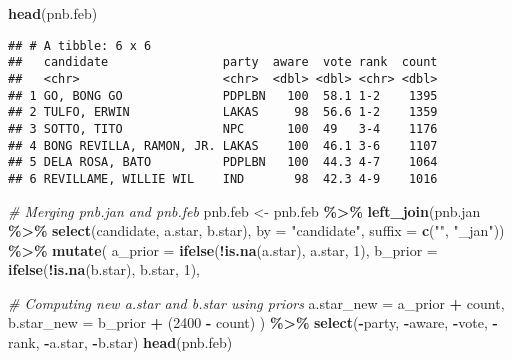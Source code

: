 \documentclass[]{article}
\newenvironment{Shaded}{\begin{snugshade}}{\end{snugshade}}
\newcommand{\AttributeTok}[1]{\textcolor[rgb]{0.13,0.29,0.53}{#1}}
\newcommand{\CommentTok}[1]{\textcolor[rgb]{0.56,0.35,0.01}{\textit{#1}}}
\newcommand{\DecValTok}[1]{\textcolor[rgb]{0.00,0.00,0.81}{#1}}
\newcommand{\FunctionTok}[1]{\textcolor[rgb]{0.13,0.29,0.53}{\textbf{#1}}}
\newcommand{\NormalTok}[1]{#1}
\newcommand{\OtherTok}[1]{\textcolor[rgb]{0.56,0.35,0.01}{#1}}
\newcommand{\SpecialCharTok}[1]{\textcolor[rgb]{0.81,0.36,0.00}{\textbf{#1}}}
\newcommand{\StringTok}[1]{\textcolor[rgb]{0.31,0.60,0.02}{#1}}
\begin{document}
\begin{Shaded}
\begin{Highlighting}[]
\FunctionTok{head}\NormalTok{(pnb.feb)}
\end{Highlighting}
\end{Shaded}

\begin{verbatim}
## # A tibble: 6 x 6
##   candidate                party  aware  vote rank  count
##   <chr>                    <chr>  <dbl> <dbl> <chr> <dbl>
## 1 GO, BONG GO              PDPLBN   100  58.1 1-2    1395
## 2 TULFO, ERWIN             LAKAS     98  56.6 1-2    1359
## 3 SOTTO, TITO              NPC      100  49   3-4    1176
## 4 BONG REVILLA, RAMON, JR. LAKAS    100  46.1 3-6    1107
## 5 DELA ROSA, BATO          PDPLBN   100  44.3 4-7    1064
## 6 REVILLAME, WILLIE WIL    IND       98  42.3 4-9    1016
\end{verbatim}

\begin{Shaded}
\begin{Highlighting}[]
\CommentTok{\# Merging pnb.jan and pnb.feb}
\NormalTok{pnb.feb }\OtherTok{\textless{}{-}}\NormalTok{ pnb.feb }\SpecialCharTok{\%\textgreater{}\%}
  \FunctionTok{left\_join}\NormalTok{(pnb.jan }\SpecialCharTok{\%\textgreater{}\%} \FunctionTok{select}\NormalTok{(candidate, a.star, b.star), }
            \AttributeTok{by =} \StringTok{"candidate"}\NormalTok{, }
            \AttributeTok{suffix =} \FunctionTok{c}\NormalTok{(}\StringTok{""}\NormalTok{, }\StringTok{"\_jan"}\NormalTok{)) }\SpecialCharTok{\%\textgreater{}\%} 
  \FunctionTok{mutate}\NormalTok{(}
    \AttributeTok{a\_prior =} \FunctionTok{ifelse}\NormalTok{(}\SpecialCharTok{!}\FunctionTok{is.na}\NormalTok{(a.star), a.star, }\DecValTok{1}\NormalTok{),  }
    \AttributeTok{b\_prior =} \FunctionTok{ifelse}\NormalTok{(}\SpecialCharTok{!}\FunctionTok{is.na}\NormalTok{(b.star), b.star, }\DecValTok{1}\NormalTok{),  }
    
    \CommentTok{\# Computing new a.star and b.star using priors}
    \AttributeTok{a.star\_new =}\NormalTok{ a\_prior }\SpecialCharTok{+}\NormalTok{ count,}
    \AttributeTok{b.star\_new =}\NormalTok{ b\_prior }\SpecialCharTok{+}\NormalTok{ (}\DecValTok{2400} \SpecialCharTok{{-}}\NormalTok{ count)}
\NormalTok{  ) }\SpecialCharTok{\%\textgreater{}\%} 
  \FunctionTok{select}\NormalTok{(}\SpecialCharTok{{-}}\NormalTok{party, }\SpecialCharTok{{-}}\NormalTok{aware, }\SpecialCharTok{{-}}\NormalTok{vote, }\SpecialCharTok{{-}}\NormalTok{rank, }\SpecialCharTok{{-}}\NormalTok{a.star, }\SpecialCharTok{{-}}\NormalTok{b.star)}
\FunctionTok{head}\NormalTok{(pnb.feb)}
\end{Highlighting}
\end{Shaded}
\end{document}
